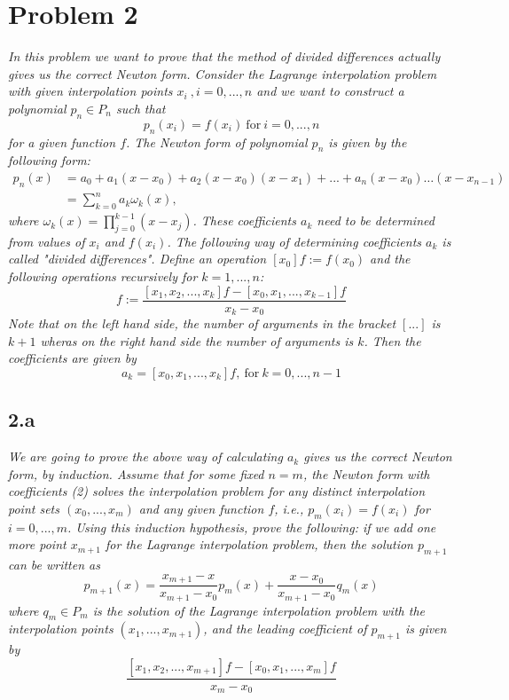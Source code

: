 \section{Problem 2}
\textit{In this problem we want to prove that the method of divided differences actually gives us the correct Newton form. Consider the Lagrange interpolation problem with given interpolation points $x_i\ , i = 0, ... , n$ and we want to construct a polynomial $p_n \in P_n$ such that}
\begin{equation*}
    p_n (x_i) = f(x_i) \ \text{for} \ i = 0, ..., n
\end{equation*}
\textit{for a given function $f$. The Newton form of polynomial $p_n$ is given by the following form:}
\begin{align*}
    p_n(x) &= a_0 + a_1 (x - x_0) + a_2 (x - x_0)(x - x_1) + ... + a_n (x - x_0) \dots (x - x_{n-1}) \\
    &= \sum_{k=0}^{n} a_k \omega_k(x),
\end{align*}
\textit{where $\omega_k(x) = \prod_{j=0}^{k-1} (x - x_j)$. These coefficients $a_k$ need to be determined from values of $x_i$ and $f(x_i)$. The following way of determining coefficients $a_k$ is called "divided differences". Define an operation $[x_0]f := f(x_0)$ and the following operations recursively for $k = 1, ..., n$:}
\begin{equation*}
    [x_0, x_1, ..., x_k] f := \frac{[x_1, x_2, ..., x_k] f - [x_0, x_1, ..., x_{k-1}] f}{x_k - x_0}
\end{equation*}
\textit{Note that on the left hand side, the number of arguments in the bracket $[...]$ is $k + 1$ wheras on the right hand side the number of arguments is $k$. Then the coefficients are given by}
\begin{equation*}
    a_k = [x_0, x_1, ..., x_k] f,\ \text{for} \ k = 0, ..., n - 1
\end{equation*}



\subsection{2.a}
\textit{We are going to prove the above way of calculating $a_k$ gives us the correct Newton form, by induction. Assume that for some fixed $n = m$, the Newton form with coefficients (2) solves the interpolation problem for any distinct interpolation point sets $(x_0, ... , x_m)$ and any given function $f$,
i.e., $p_m(x_i) = f(x_i)$ for $i = 0, ... , m$. Using this induction hypothesis, prove the following: if we add one more point $x_{m+1}$ for the Lagrange interpolation problem, then the solution $p_{m+1}$ can be written as}
\begin{equation}
\label{eq:2a}
    p_{m+1}(x) = \frac{x_{m+1} - x}{x_{m+1} - x_0} p_m(x) + \frac{x - x_0}{x_{m+1} - x_0} q_m(x)
\end{equation}
\textit{where $q_m \in P_m$ is the solution of the Lagrange interpolation problem with the interpolation points $(x_1, ... , x_{m+1})$, and the leading coefficient of $p_{m+1}$ is given by}
\begin{equation}
\label{eq:2a-coeff}
    \frac{[x_1, x_2, ..., x_{m+1}] f - [x_0, x_1, ..., x_m] f}{x_m - x_0}
\end{equation}

